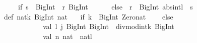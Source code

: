 \begin{isabellebody}
\begin{isamarkuptext}
\ \ \ \ {}if\ {}s\ {}{}\ BigInt{}{}{}{}\ {}{}{}\ r{}{}\ BigInt{}{}{}{}\isanewline
\ \ \ \ \ \ else\ {}{}{}\ r{}\ {}\ BigInt{}{}{}{}\ abs{}int{}l{}\ {}\ s{}{}\isanewline
\ \ {}{}{}{}{}\isanewline
\isanewline
def\ nat{}k{}\ BigInt{}{}\ nat\ {}\isanewline
\ \ {}if\ {}k\ {}{}\ BigInt{}{}{}{}\ Zero{}nat\isanewline
\ \ \ \ else\ {}\isanewline
\ \ \ \ \ \ \ \ \ \ \ val\ {}l{}\ j{}{}\ {}BigInt{}\ BigInt{}\ {}\ divmod{}int{}k{}\ BigInt{}{}{}{}\isanewline
\ \ \ \ \ \ \ \ \ \ \ val\ n{}\ nat\ {}\ nat{}l{}\isanewline

\end{isamarkuptext}
\end{isabellebody}
